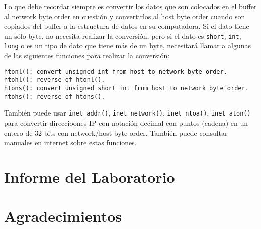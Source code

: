 Lo que debe recordar siempre es convertir los datos que son colocados en el buffer al network byte order en cuestión y convertirlos al host byte order cuando son copiados del buffer a la estructura de datos en su computadora. Si el dato tiene un sólo byte, no necesita realizar la conversión, pero si el dato es {\tt short}, 
{\tt int}, {\tt long} o es un tipo de dato que tiene más de un byte, necesitará llamar a algunas de las siguientes funciones para realizar la conversión:

\begin{lstlisting}
htonl(): convert unsigned int from host to network byte order.
ntohl(): reverse of htonl().
htons(): convert unsigned short int from host to network byte order.
ntohs(): reverse of htons().
\end{lstlisting}


También puede usar {\tt inet\_addr()}, {\tt inet\_network()},
{\tt inet\_ntoa()}, {\tt inet\_aton()} para convertir direccioones IP con notación decimal con puntos (cadena) en un entero de 32-bits con network/host byte order. También puede consultar manuales en internet sobre estas funciones.

\section{Informe del Laboratorio}



\section{Agradecimientos}








